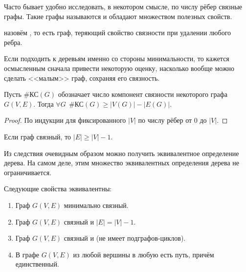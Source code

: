 Часто бывает удобно исследовать, в некотором смысле,  по числу рёбер связные графы.
Такие графы называются  и обладают множеством полезных свойств.

\begin{definition}
     назовём , то есть граф, теряющий свойство связности при удалении любого ребра.
\end{definition}

Если подходить к деревьям именно со стороны минимальности, то кажется осмысленным сначала привести некоторую оценку,
насколько вообще можно сделать <<малым>> граф, сохраняя его связность.

\begin{theorem}
    Пусть $ \text{\#КС}(G) $ обозначает число компонент связности некоторого графа $ G(V, E) $.
    Тогда $ \forall G \;\, \text{\#КС}(G) \geqslant |V(G)| - |E(G)| $.
\end{theorem}

\begin{proof}
    По индукции для фиксированного $ |V| $ по числу рёбер от $ 0 $ до $ |V| $.
\end{proof}

\begin{corollary}
    Если граф связный, то $ |E| \geqslant |V| - 1 $.
\end{corollary}

Из следствия очевидным образом можно получить эквивалентное определение дерева.
На самом деле, этим множество эквивалентных определения дерева не ограничивается.

\begin{theorem}
    \label{theorem:graphs:trees_defs}
    Следующие свойства эквивалентны:
    \begin{enumerate}[label=(\arabic*)]
        \item
            Граф $ G(V,E) $ минимально связный.
        \item
            \label{item:graphs:e_v_minus_one}
            Граф $ G(V,E) $ связный и $ |E| = |V| - 1 $.
        \item
            Граф $ G(V,E) $ связный и  (не имеет подграфов-циклов).
        \item
            В графе $ G(V,E) $ из любой вершины в любую есть путь, причём единственный.
    \end{enumerate}
\end{theorem}

